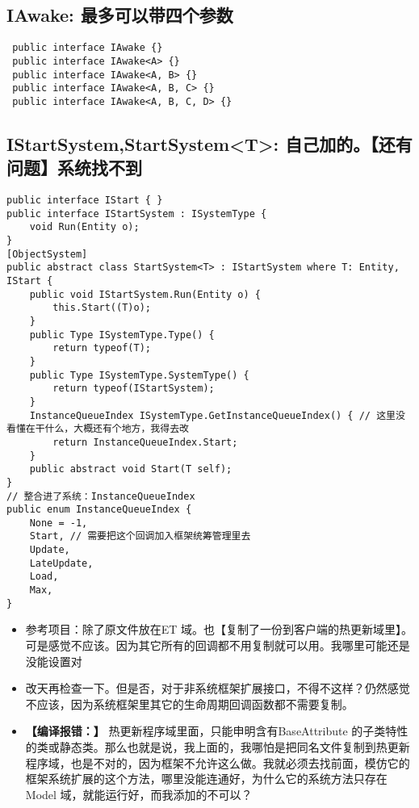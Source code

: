 \documentclass[9pt, b5paper]{article}
\begin{document}
\subsection{IAwake: 最多可以带四个参数}
\label{sec-1-6}
\begin{verbatim}
 public interface IAwake {}
 public interface IAwake<A> {}
 public interface IAwake<A, B> {}
 public interface IAwake<A, B, C> {}
 public interface IAwake<A, B, C, D> {}
\end{verbatim}
\subsection{IStartSystem,StartSystem<T>: 自己加的。【还有问题】系统找不到}
\label{sec-1-7}
\begin{verbatim}
public interface IStart { }
public interface IStartSystem : ISystemType {
    void Run(Entity o);
}
[ObjectSystem]
public abstract class StartSystem<T> : IStartSystem where T: Entity, IStart {
    public void IStartSystem.Run(Entity o) {
        this.Start((T)o);
    }
    public Type ISystemType.Type() {
        return typeof(T);
    }
    public Type ISystemType.SystemType() {
        return typeof(IStartSystem);
    }
    InstanceQueueIndex ISystemType.GetInstanceQueueIndex() { // 这里没看懂在干什么，大概还有个地方，我得去改
        return InstanceQueueIndex.Start; 
    }
    public abstract void Start(T self);
}
// 整合进了系统：InstanceQueueIndex
public enum InstanceQueueIndex {
    None = -1,
    Start, // 需要把这个回调加入框架统筹管理里去 
    Update,
    LateUpdate,
    Load,
    Max,
}
\end{verbatim}
\begin{itemize}
\item 参考项目：除了原文件放在ET 域。也【复制了一份到客户端的热更新域里】。可是感觉不应该。因为其它所有的回调都不用复制就可以用。我哪里可能还是没能设置对
\item 改天再检查一下。但是否，对于非系统框架扩展接口，不得不这样？仍然感觉不应该，因为系统框架里其它的生命周期回调函数都不需要复制。
\item \textbf{【编译报错：】} 热更新程序域里面，只能申明含有BaseAttribute 的子类特性的类或静态类。那么也就是说，我上面的，我哪怕是把同名文件复制到热更新程序域，也是不对的，因为框架不允许这么做。我就必须去找前面，模仿它的框架系统扩展的这个方法，哪里没能连通好，为什么它的系统方法只存在Model 域，就能运行好，而我添加的不可以？
\end{itemize}
\end{document}
